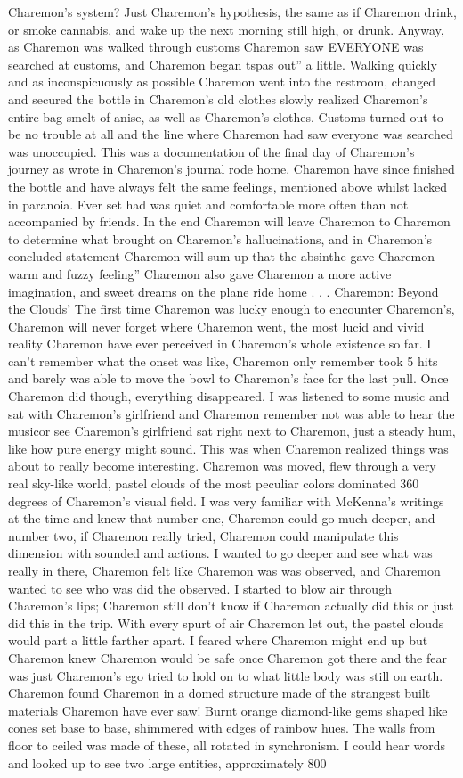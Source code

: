 \documentclass[12pt]{book}
\begin{document}
Charemon's system? Just Charemon's hypothesis, the same as if Charemon drink, or smoke cannabis, and wake up the next morning still high, or drunk. Anyway, as Charemon was walked through customs Charemon saw EVERYONE was searched at customs, and Charemon began tspas out'' a little. Walking quickly and as inconspicuously as possible Charemon went into the restroom, changed and secured the bottle in Charemon's old clothes slowly realized Charemon's entire bag smelt of anise, as well as Charemon's clothes. Customs turned out to be no trouble at all and the line where Charemon had saw everyone was searched was unoccupied. This was a documentation of the final day of Charemon's journey as wrote in Charemon's journal rode home. Charemon have since finished the bottle and have always felt the same feelings, mentioned above whilst lacked in paranoia. Ever set had was quiet and comfortable more often than not accompanied by friends. In the end Charemon will leave Charemon to Charemon to determine what brought on Charemon's hallucinations, and in Charemon's concluded statement Charemon will sum up that the absinthe gave Charemon warm and fuzzy feeling'' Charemon also gave Charemon a more active imagination, and sweet dreams on the plane ride home . . . Charemon: Beyond the Clouds' The first time Charemon was lucky enough to encounter Charemon's, Charemon will never forget where Charemon went, the most lucid and vivid reality Charemon have ever perceived in Charemon's whole existence so far. I can't remember what the onset was like, Charemon only remember took 5 hits and barely was able to move the bowl to Charemon's face for the last pull. Once Charemon did though, everything disappeared. I was listened to some music and sat with Charemon's girlfriend and Charemon remember not was able to hear the musicor see Charemon's girlfriend sat right next to Charemon, just a steady hum, like how pure energy might sound. This was when Charemon realized things was about to really become interesting. Charemon was moved, flew through a very real sky-like world, pastel clouds of the most peculiar colors dominated 360 degrees of Charemon's visual field. I was very familiar with McKenna's writings at the time and knew that number one, Charemon could go much deeper, and number two, if Charemon really tried, Charemon could manipulate this dimension with sounded and actions. I wanted to go deeper and see what was really in there, Charemon felt like Charemon was was observed, and Charemon wanted to see who was did the observed. I started to blow air through Charemon's lips; Charemon still don't know if Charemon actually did this or just did this in the trip. With every spurt of air Charemon let out, the pastel clouds would part a little farther apart. I feared where Charemon might end up but Charemon knew Charemon would be safe once Charemon got there and the fear was just Charemon's ego tried to hold on to what little body was still on earth. Charemon found Charemon in a domed structure made of the strangest built materials Charemon have ever saw! Burnt orange diamond-like gems shaped like cones set base to base, shimmered with edges of rainbow hues. The walls from floor to ceiled was made of these, all rotated in synchronism. I could hear words and looked up to see two large entities, approximately 800 
\end{document}
